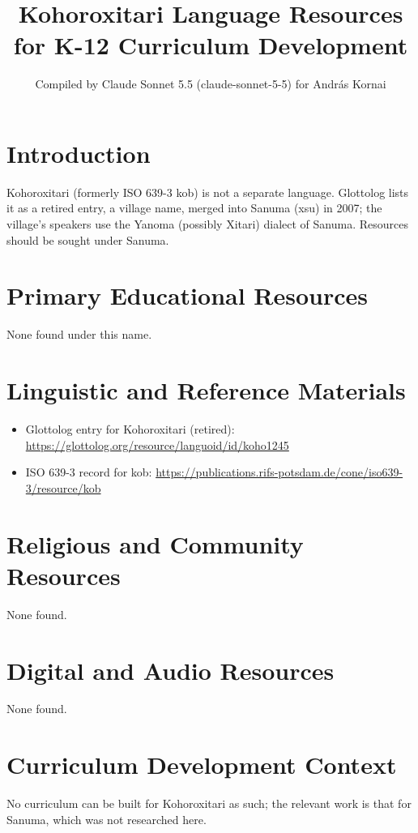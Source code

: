 \documentclass[12pt]{article}
\title{Kohoroxitari Language Resources for K-12 Curriculum Development}
\author{Compiled by Claude Sonnet 5.5 (claude-sonnet-5-5) for Andr\'as Kornai}
\date{}
\begin{document}
\maketitle

\section{Introduction}
Kohoroxitari (formerly ISO 639-3 kob) is not a separate language. Glottolog lists it as a retired entry, a village name, merged into Sanuma (xsu) in 2007; the village's speakers use the Yanoma (possibly Xitari) dialect of Sanuma. Resources should be sought under Sanuma.

\section{Primary Educational Resources}
None found under this name.

\section{Linguistic and Reference Materials}
\begin{itemize}
\item Glottolog entry for Kohoroxitari (retired): \url{https://glottolog.org/resource/languoid/id/koho1245}
\item ISO 639-3 record for kob: \url{https://publications.rifs-potsdam.de/cone/iso639-3/resource/kob}
\end{itemize}

\section{Religious and Community Resources}
None found.

\section{Digital and Audio Resources}
None found.

\section{Curriculum Development Context}
No curriculum can be built for Kohoroxitari as such; the relevant work is that for Sanuma, which was not researched here.
\end{document}
